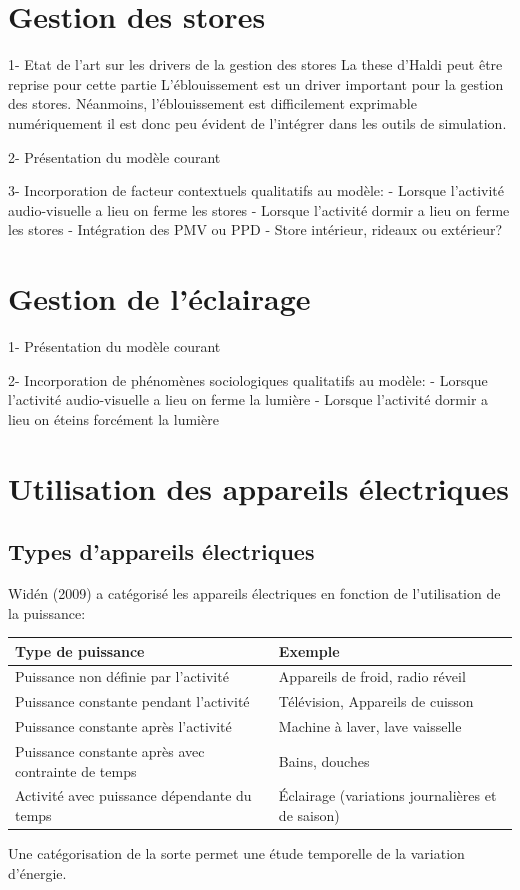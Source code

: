 \section{Gestion des stores}

1- Etat de l'art sur les drivers de la gestion des stores
La these d'Haldi peut être reprise pour cette partie
L'éblouissement est un driver important pour la gestion des stores. Néanmoins, l'éblouissement est difficilement exprimable numériquement il est donc peu évident de l'intégrer dans les outils de simulation.

2- Présentation du modèle courant

3- Incorporation de facteur contextuels qualitatifs au modèle:
	- Lorsque l'activité audio-visuelle a lieu on ferme les stores
	- Lorsque l'activité dormir a lieu on ferme les stores
	- Intégration des PMV ou PPD
	- Store intérieur, rideaux ou extérieur?
	
\section{Gestion de l'éclairage}
\label{Gestion de l'éclairage}

1- Présentation du modèle courant

2- Incorporation de phénomènes sociologiques qualitatifs au modèle:
	- Lorsque l'activité audio-visuelle a lieu on ferme la lumière
	- Lorsque l'activité dormir a lieu on éteins forcément la lumière

\section{Utilisation des appareils électriques}

\subsection{Types d'appareils électriques}

Widén (2009) a catégorisé les appareils électriques en fonction de l'utilisation de la puissance:
\begin{table} [H]
\centering
\begin{tabular}{|l||l|}
\hline Type de puissance & Exemple \\
\hline
\hline Puissance non définie par l'activité & Appareils de froid, radio réveil \\
\hline Puissance constante pendant l'activité & Télévision, Appareils de cuisson \\
\hline Puissance constante après l'activité & Machine à laver, lave vaisselle \\
\hline Puissance constante après avec contrainte de temps & Bains, douches \\
\hline Activité avec puissance dépendante du temps & Éclairage (variations journalières et de saison) \\
\hline 
\end{tabular}
\end{table}
Une catégorisation de la sorte permet une étude temporelle de la variation d'énergie.

